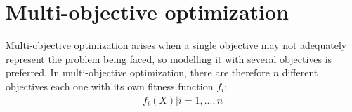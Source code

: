 \documentclass{llncs}
\begin{document}
%
%
%
%


%
\section{Multi-objective optimization}
\label{sec:sec3}
%

Multi-objective optimization arises when a single objective may not adequately represent the problem being faced, so modelling it with several objectives is preferred. In multi-objective optimization, there are therefore $n$ different objectives each one with its own fitness function $f_i$:
\begin{equation*}
\begin{aligned}
f_i(X) | i = 1,...,n
\end{aligned}
\end{equation*}
\end{document}
